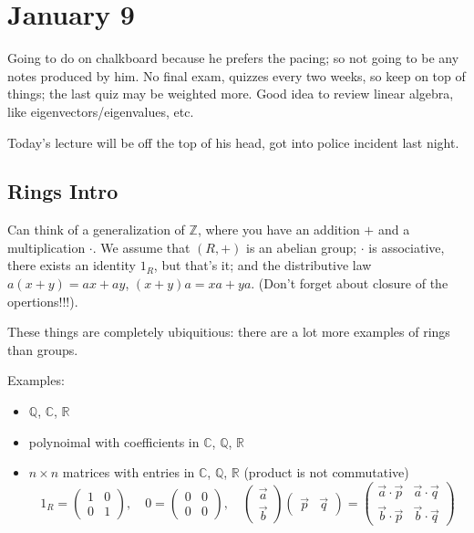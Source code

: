 \documentclass{article}
\theoremstyle{plain}
\theoremstyle{remark}
\newcommand{\Z}{{\mathbb Z}}
\newcommand{\Q}{{\mathbb Q}}
\newcommand{\R}{{\mathbb R}}
\newcommand{\C}{{\mathbb C}}
\begin{document}
\section{January 9}
Going to do on chalkboard because he prefers the pacing;
so not going to be any notes produced by him.
No final exam, quizzes every two weeks, so keep on top of things;
the last quiz may be weighted more.
Good idea to review linear algebra, like eigenvectors/eigenvalues, etc.

Today's lecture will be off the top of his head, got into police incident last night.

\subsection{Rings Intro}
Can think of a generalization of $\Z$,
where you have an addition $+$ and a multiplication $\cdot$.
We assume that $(R,+)$ is an abelian group;
$\cdot$ is associative, there exists an identity $1_R$, but that's it;
and the distributive law $a(x+y) = ax + ay$, $(x+y)a = xa+ya$.
(Don't forget about closure of the opertions!!!).

These things are completely ubiquitious:
there are a lot more examples of rings than groups.

\noindent Examples:
\begin{itemize}
	\item $\Q$, $\C$, $\R$
	\item polynoimal with coefficients in $\C$, $\Q$, $\R$
	\item $n \times n$ matrices with entries in $\C$, $\Q$, $\R$
		(product is not commutative)
		\[
			1_R = \begin{pmatrix} 1 & 0 \\ 0 & 1 \end{pmatrix}, \quad
			0 = \begin{pmatrix} 0 & 0 \\ 0 & 0 \end{pmatrix}, \quad
			\begin{pmatrix} \vec{a} \\ \vec{b} \end{pmatrix}
			\begin{pmatrix} \vec{p} & \vec{q} \end{pmatrix}
			= \begin{pmatrix} \vec{a} \cdot \vec{p} & \vec{a} \cdot \vec{q}\\
			\vec{b} \cdot \vec{p} & \vec{b} \cdot \vec{q} \end{pmatrix}
		\]
\end{itemize}
\end{document}
